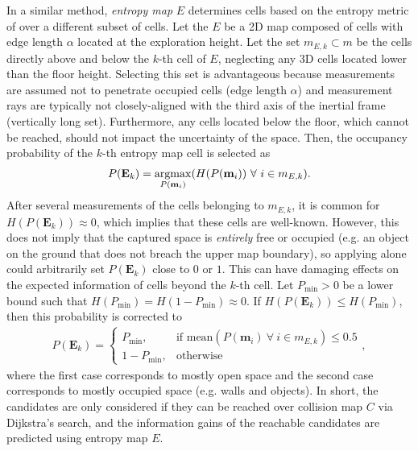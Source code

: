 In a similar method, \emph{entropy map} $E$ determines cells based on the entropy metric of  over a different subset of cells. Let the $E$ be a 2D map composed of cells with edge length $\alpha$ located at the exploration height. Let the set $ m_{E,k}\subset m$ be the cells directly above and below the $k$-th cell of $E$, neglecting any 3D cells located lower than the floor height. Selecting this set is advantageous because measurements are assumed not to penetrate occupied cells (edge length $\alpha$) and measurement rays are typically not closely-aligned with the third axis of the inertial frame (vertically long set). Furthermore, any cells located below the floor, which cannot be reached, should not impact the uncertainty of the space. Then, the occupancy probability of the $k$-th entropy map cell is selected as
\begin{align}
\label{eqn:ProbEntropyMap}
P(\mathbf{E}_k)=\argmax_{P(\mathbf{m}_i)}(H(P(\mathbf{m}_i))\ \forall \ i\in m_{E,k}).
\end{align}
After several measurements of the cells belonging to $ m_{E,k}$, it is common for $H(P(\mathbf{E}_k))\approx0$, which implies that these cells are well-known. However, this does not imply that the captured space is \emph{entirely} free or occupied (e.g. an object on the ground that does not breach the upper map boundary), so applying  alone could arbitrarily set $P(\mathbf{E}_k)$ close to $0$ or $1$. This can have damaging effects on the expected information of cells beyond the $k$-th cell. Let $P_\text{min}>0$ be a lower bound such that $H(P_\text{min})=H(1-P_\text{min})\approx0$. If $H(P(\mathbf{E}_k))\leq H(P_\text{min})$, then this probability is corrected to
\begin{align}
P(\mathbf{E}_k)= 
\begin{cases}
    P_\text{min},			& \text{if } \text{mean}(P(\mathbf{m}_i)\ \forall \ i\in m_{E,k})\leq0.5\\
    1-P_\text{min},              & \text{otherwise}
\end{cases},
\end{align}
where the first case corresponds to mostly open space and the second case corresponds to mostly occupied space (e.g. walls and objects). In short, the candidates are only considered if they can be reached over collision map $C$ via Dijkstra's search, and the information gains of the reachable candidates are predicted using entropy map $E$.

